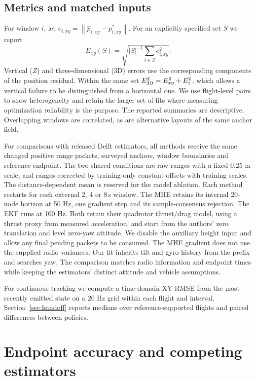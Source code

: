 \documentclass{IEEEtaes}
\newcommand{\norm}[1]{\left\lVert#1\right\rVert}
\begin{document}
\subsection{Metrics and matched inputs}
For window \(i\), let \(e_{i,xy}=\norm{\hat p_{i,xy}-p^*_{i,xy}}\). For an explicitly specified set \(S\) we report
\begin{equation}
 E_{xy}(S)=\sqrt{|S|^{-1}\sum_{i\in S}e_{i,xy}^2}. \label{eq:score}
\end{equation}
Vertical (\(Z\)) and three-dimensional (3D) errors use the corresponding components of the position residual. Within the same set \(E_{\rm 3D}^2=E_{xy}^2+E_z^2\), which allows a vertical failure to be distinguished from a horizontal one. We use flight-level pairs to show heterogeneity and retain the larger set of fits where measuring optimization reliability is the purpose. The reported summaries are descriptive. Overlapping windows are correlated, as are alternative layouts of the same anchor field.

For comparisons with released Delft estimators, all methods receive the same changed positive range packets, surveyed anchors, window boundaries and reference endpoint. The two shared conditions are raw ranges with a fixed \(0.25\) m scale, and ranges corrected by training-only constant offsets with training scales. The distance-dependent mean is reserved for the model ablation. Each method restarts for each external 2, 4 or 8\,s window. The MHE retains its internal 20-node horizon at 50 Hz, one gradient step and its sample-consensus rejection. The EKF runs at 100 Hz. Both retain their quadrotor thrust/drag model, using a thrust proxy from measured acceleration, and start from the authors' zero translation and level zero-yaw attitude. We disable the auxiliary height input and allow any final pending packets to be consumed. The MHE gradient does not use the supplied radio variances. Our fit inherits tilt and gyro history from the prefix and searches yaw. The comparison matches radio information and endpoint times while keeping the estimators' distinct attitude and vehicle assumptions.

For continuous tracking we compute a time-domain XY RMSE from the most recently emitted state on a 20 Hz grid within each flight and interval. Section~\ref{sec:handoff} reports medians over reference-supported flights and paired differences between policies.

\section{Endpoint accuracy and competing estimators}\label{sec:results}
\end{document}
